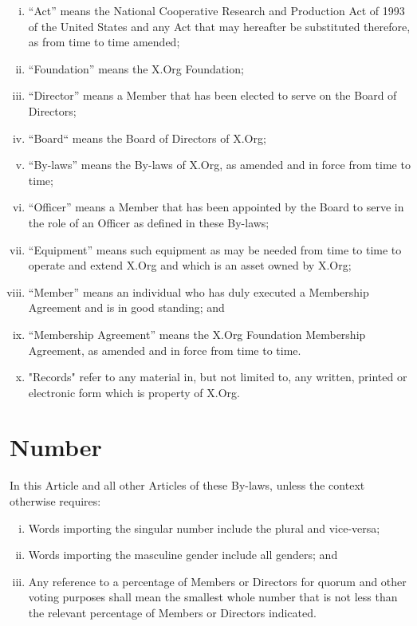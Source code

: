 \documentclass[10pt, english]{xorgdocs}
\begin{document}
\begin{enumerate}[(i)\hspace{.2cm}]
	\item ``Act'' means the National Cooperative Research and Production Act
	of 1993 of the United States and any Act that may hereafter be
	substituted therefore, as from time to time amended;

	\item ``Foundation'' means the X.Org Foundation;

	\item ``Director'' means a Member that has been elected to serve on the
	Board of Directors;

	\item ``Board`` means the Board of Directors of X.Org;

	\item ``By-laws'' means the By-laws of X.Org, as amended and in force
	from time to time;

	\item ``Officer'' means a Member that has been appointed by the Board to
	serve in the role of an Officer as defined in these By-laws;

	\item ``Equipment'' means such equipment as may be needed from time to
	time to operate and extend X.Org and which is an asset owned by X.Org;

	\item ``Member'' means an individual who has duly executed a Membership
	Agreement and is in good standing; and

	\item ``Membership Agreement'' means the X.Org Foundation Membership
	Agreement, as amended and in force from time to time.

	\item "Records" refer to any material in, but not limited to, any written,
	printed or electronic form which is property of X.Org.
\end{enumerate}

\section{Number}
In this Article and all other Articles of these By-laws, unless the context
otherwise requires:

\begin{enumerate}[(i)\hspace{.2cm}]
	\item Words importing the singular number include the plural and
		vice-versa;

	\item Words importing the masculine gender include all genders; and

	\item Any reference to a percentage of Members or Directors for quorum
	and other voting purposes shall mean the smallest whole number
	that is not less than the relevant percentage of Members or Directors
	indicated.
\end{enumerate}
\end{document}
